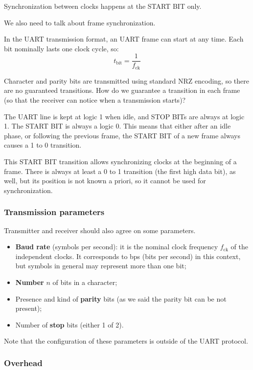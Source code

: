 \documentclass[a4paper,11pt]{article}
\begin{document}
Synchronization between clocks happens at the START BIT only.

\par\smallskip

We also need to talk about frame synchronization.

In the UART transmission format, an UART frame can start at any time.
Each bit nominally lasts one clock cycle, so:
$$
	t_\text{bit} = \frac{1}{f_\text{ck}}
$$

Character and parity bits are transmitted using standard NRZ encoding, so there are no guaranteed transitions.
How do we guarantee a transition in each frame (so that the receiver can notice when a transmission starts)?

The UART line is kept at logic 1 when idle, and STOP BITs are always at logic 1.
The START BIT is always a logic 0.
This means that either after an idle phase, or following the previous frame, the START BIT of a new frame always causes a 1 to 0 transition.

This START BIT transition allows synchronizing clocks at the beginning of a frame.
There is always at least a 0 to 1 transition (the first high data bit), as well, but its position is not known a priori, so it cannot be used for synchronization.

\subsubsection{Transmission parameters}

Transmitter and receiver should also agree on some parameters.

\begin{itemize}
	\item \textbf{Baud rate} (symbols per second): it is the nominal clock frequency $f_\text{ck}$ of the independent clocks. It corresponds to bps (bits per second) in this context, but symbols in general may represent more than one bit;
	\item \textbf{Number} $n$ of bits in a character;
	\item Presence and kind of \textbf{parity} bits (as we said the parity bit can be not present);
	\item Number of \textbf{stop} bits (either 1 of 2).
\end{itemize}

Note that the configuration of these parameters is outside of the UART protocol.

\subsubsection{Overhead}
\end{document}
